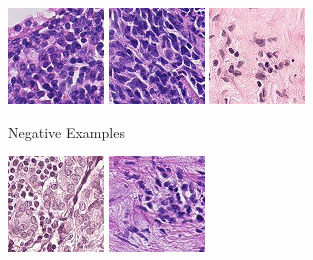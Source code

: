 \begin{figure}
	\centering
	\begin{subfigure}{\textwidth}
		\centering
		\includegraphics[width=0.3\linewidth]{images/pcam_0_0.png}
		\includegraphics[width=0.3\linewidth]{images/pcam_79_0.png}
		\includegraphics[width=0.3\linewidth]{images/pcam_13_0.png}
		\caption{Negative Examples}
	\end{subfigure}
	\begin{subfigure}{\textwidth}
	\centering
	\includegraphics[width=0.3\linewidth]{images/pcam_1_1.png}
	\includegraphics[width=0.3\linewidth]{images/pcam_78_1.png}

\end{subfigure}
\end{figure}
